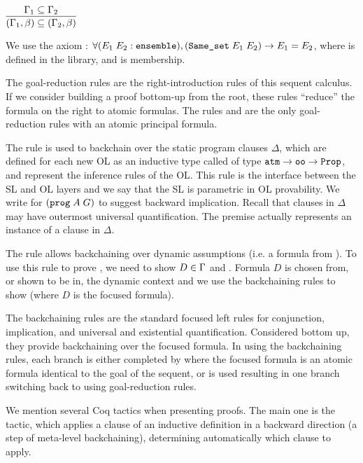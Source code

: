 \begin{lem}
$\vcenter{\infer{(\dyncon{}_1 , \beta) \subseteq (\dyncon{}_2 , \beta)}{\dyncon{}_1 \subseteq \dyncon{}_2}}$
\end{lem}
We use the  axiom  : $\forall (E_1 \; E_2 : \texttt{ensemble}),(\texttt{Same\_set} \; E_1 \; E_2) \rightarrow E_1 = E_2$, where  is defined in the  library, and  is  membership.


The goal-reduction rules are the right-introduction rules of this sequent calculus. If we consider building a proof bottom-up from the root, these rules ``reduce'' the formula on the right to atomic formulas. The rules \rlnmsbc{} and \rlnmsinit{} are the only goal-reduction rules with an atomic principal formula.

The rule \rlnmsbc{} is used to backchain over the static program clauses $\Delta$, which are defined for each new OL as an inductive type called  of type $\texttt{atm} \rightarrow \texttt{oo} \rightarrow \texttt{Prop}$, and represent the inference rules of the OL.  This rule is the interface between the SL and OL layers and we say that the SL is parametric in OL provability. We write  for $(\texttt{prog} \; A \; G)$ to suggest backward implication. Recall that clauses in $\Delta$ may have outermost universal quantification. The premise  actually represents an instance of a clause in $\Delta$.

The rule \rlnmsinit{} allows backchaining over dynamic assumptions (i.e. a formula from \dyncon{}). To use this rule to prove , we need to show $D \in \Gamma{}$ and . Formula $D$ is chosen from, or shown to be in, the dynamic context \dyncon{} and we use the backchaining rules to show  (where $D$ is the focused formula).

The backchaining rules are the standard focused left rules for conjunction, implication, and universal and existential quantification. Considered bottom up, they provide backchaining over the focused formula. In using the backchaining rules, each branch is either completed by \rlnmbmatch{} where the focused formula is an atomic formula identical to the goal of the sequent, or \rlnmbimp{} is used resulting in one branch switching back to using goal-reduction rules.

We mention several Coq tactics when presenting proofs. The main one is the  tactic, which applies a clause of an inductive definition in a backward direction (a step of meta-level backchaining), determining automatically which clause to apply.


